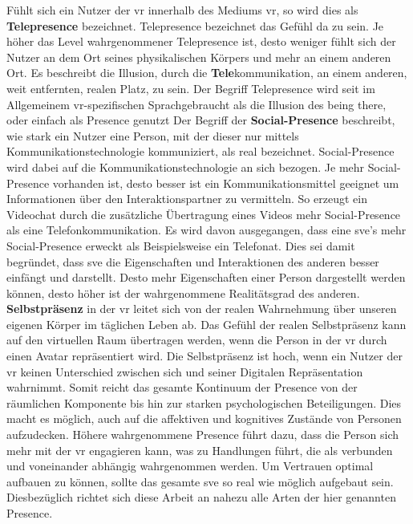 \documentclass[a4paper,11pt]{article}%
\renewcommand{\\}{\vspace*{0.5\baselineskip} \newline}
\begin{document}
Fühlt sich ein Nutzer der \ac{vr} \dq{}innerhalb\dq{} des Mediums \ac{vr}, so wird dies als \textbf{Telepresence} bezeichnet. Telepresence bezeichnet das Gefühl \dq{}da zu sein\dq{}. Je höher das Level wahrgenommener Telepresence ist, desto weniger fühlt sich der Nutzer an dem Ort seines physikalischen Körpers und mehr an einem anderen Ort. \citep[p.482]{nowak2004effect} Es beschreibt die Illusion, durch die \textbf{Tele}kommunikation, an einem anderen, weit entfernten, realen Platz, zu sein. Der Begriff Telepresence wird seit \cite[p.12]{biocca1999cyborg} im Allgemeinem \ac{vr}-spezifischen Sprachgebraucht als die Illusion des \dq{}being there\dq{}, oder einfach als \dq{}Presence\dq{} genutzt\\
Der Begriff der \dq{}\textbf{Social-Presence} \dq{} beschreibt, wie stark ein Nutzer eine Person, mit der dieser nur mittels Kommunikationstechnologie kommuniziert, als \dq{}real\dq{} bezeichnet. Social-Presence wird dabei auf die Kommunikationstechnologie an sich bezogen. Je mehr Social-Presence vorhanden ist, desto besser ist ein Kommunikationsmittel geeignet um Informationen über den Interaktionspartner zu vermitteln. So erzeugt ein Videochat durch die zusätzliche Übertragung eines Videos mehr Social-Presence als eine Telefonkommunikation.  \citep[p.151]{gunawardena1995social}
Es wird davon ausgegangen, dass eine \ac{sve}'s mehr Social-Presence erweckt als Beispielsweise ein Telefonat. Dies sei damit begründet, dass \ac{sve} die Eigenschaften und Interaktionen des anderen besser einfängt und darstellt. Desto mehr Eigenschaften einer Person dargestellt werden können, desto höher ist der wahrgenommene Realitätsgrad des anderen. \citep[p. 5-8]{biocca2002defining}\\
\textbf{Selbstpräsenz} in der \ac{vr} leitet sich von der realen Wahrnehmung über unseren eigenen Körper im täglichen Leben ab. Das Gefühl der realen Selbstpräsenz kann auf den virtuellen Raum übertragen werden, wenn die Person in der \ac{vr} durch einen Avatar repräsentiert wird. Die Selbstpräsenz ist hoch, wenn ein Nutzer der \ac{vr} keinen Unterschied zwischen sich und seiner Digitalen Repräsentation wahrnimmt. \citep[p.439]{schultze2010embodiment}\\
Somit reicht das gesamte Kontinuum der \dq{}Presence\dq{} von der räumlichen Komponente bis hin zur starken psychologischen Beteiligungen. Dies macht es möglich, auch auf die affektiven und kognitives Zustände von Personen aufzudecken. Höhere wahrgenommene Presence führt dazu, dass die Person sich mehr mit der \ac{vr} engagieren kann, was zu Handlungen führt, die als verbunden und voneinander abhängig wahrgenommen werden. \citep{biocca2001criteria}
Um Vertrauen optimal aufbauen zu können, sollte das gesamte \ac{sve} so real wie möglich aufgebaut sein. Diesbezüglich richtet sich diese Arbeit an nahezu alle Arten der hier genannten \dq{}Presence\dq{}.
\end{document}
